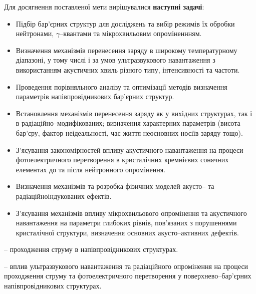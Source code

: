 Для досягнення поставленої мети вирішувалися \textbf{наступні задачі}:
\begin{itemize}[leftmargin=0em,itemindent=1.5em]
\renewcommand{\labelitemi}{$\bullet$}
  \item Підбір бар'єрних структур для досліджень та вибір режимів їх обробки нейтронами, $\gamma$--квантами та мікрохвильовим опроміненнням.

  \item Визначення механізмів перенесення заряду в широкому температурному діапазоні, у тому числі і за умов ультразвукового навантаження з використанням акустичних хвиль різного типу, інтенсивності та частоти.

 \item Проведення порівняльного аналізу та оптимізації методів визначення параметрів напівпровідникових бар'єрних структур.

  \item Встановлення механізмів перенесення заряду як у вихідних структурах, так і в радіаційно--модифікованих; визначення характерних параметрів (висота бар'єру, фактор неідеальності, час життя неосновних носіїв заряду тощо).

  \item З'ясування закономірностей впливу акустичного навантаження на процеси фотоелектричного перетворення в кристалічних кремнієвих сонячних елементах до та після нейтронного опромінення.

  \item Визначення механізмів та розробка фізичних моделей акусто-- та радіаційноіндукованих ефектів.

  \item З'ясування механізмів впливу мікрохвильового опромінення та акустичного навантаження на параметри глибоких рівнів, пов'язаних з порушеннями кристалічної структури,
  визначення основних акусто--активних дефектів.

\end{itemize}


{\ObjectTXT} --
проходження струму в напівпровідникових структурах.

{\PredmetTXT}--
вплив ультразвукового навантаження та радіаційного опромінення на
процеси проходження струму та фотоелектричного перетворення у поверхнево--бар'єрних напівпровідникових структурах.


